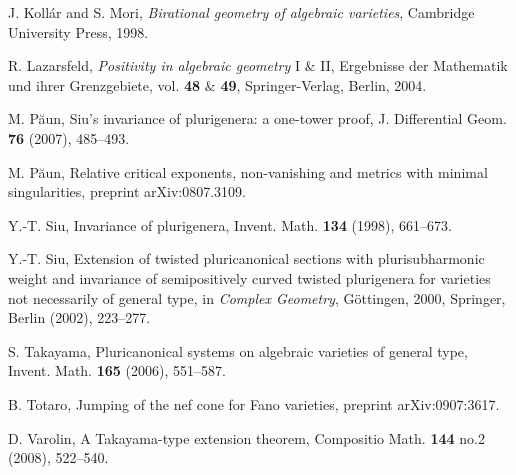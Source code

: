\documentclass[11pt]{amsart}
\theoremstyle{plain}
\theoremstyle{definition}
\begin{document}
\begin{thebibliography}{La}
J. Koll\'ar and S. Mori, \emph{Birational geometry of algebraic varieties}, Cambridge University Press, 1998.

R. Lazarsfeld, \emph{Positivity in algebraic geometry} I $\&$ II,
Ergebnisse der Mathematik und ihrer Grenzgebiete, vol.
\textbf{48} $\&$ \textbf{49}, Springer-Verlag, Berlin, 2004.

M. P\u aun, {Siu's invariance of plurigenera: a one-tower proof}, J. Differential Geom. \textbf{76} (2007), 485--493.

M. P\u aun, {Relative critical exponents, non-vanishing and metrics with minimal singularities}, 
preprint arXiv:0807.3109.

Y.-T. Siu, {Invariance of plurigenera}, Invent. Math. \textbf{134} (1998), 661--673.

Y.-T. Siu, {Extension of twisted pluricanonical sections with plurisubharmonic weight and 
invariance of semipositively curved twisted plurigenera for varieties not necessarily of general type}, 
in \emph{Complex Geometry}, G\" ottingen, 2000, Springer, Berlin (2002), 223--277.

S. Takayama, {Pluricanonical systems on algebraic varieties of general type}, Invent. Math. \textbf{165} (2006), 551--587.

B. Totaro, {Jumping of the nef cone for Fano varieties}, preprint arXiv:0907:3617.

D. Varolin, {A Takayama-type extension theorem}, Compositio Math. \textbf{144} no.2 (2008), 522--540.

\end{thebibliography}
\end{document}
